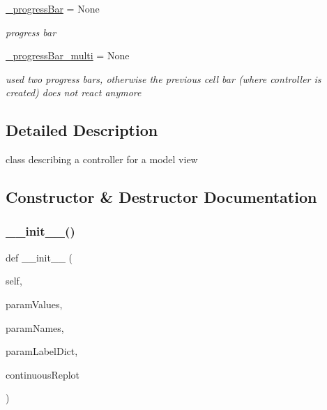 \begin{DoxyCompactItemize}
\hyperlink{class_mu_mo_t_1_1_mu_mo_tcontroller_a018864aa22d2adb0d3958fb0adbce8e2}{\+\_\+progress\+Bar} = None
\begin{DoxyCompactList}\small\item\em progress bar \end{DoxyCompactList}\item 
\hyperlink{class_mu_mo_t_1_1_mu_mo_tcontroller_a1da52cde6b2b94a1005eaa6898d2f8c5}{\+\_\+progress\+Bar\+\_\+multi} = None
\begin{DoxyCompactList}\small\item\em used two progress bars, otherwise the previous cell bar (where controller is created) does not react anymore \end{DoxyCompactList}\end{DoxyCompactItemize}


\subsection{Detailed Description}
class describing a controller for a model view 

\subsection{Constructor \& Destructor Documentation}
\mbox{\label{class_mu_mo_t_1_1_mu_mo_tcontroller_a73251532d0348adaeafe8a178cfc6a73}} 
\subsubsection{\texorpdfstring{\+\_\+\+\_\+init\+\_\+\+\_\+()}{\_\_init\_\_()}}
{\footnotesize\ttfamily def \+\_\+\+\_\+init\+\_\+\+\_\+ (\begin{DoxyParamCaption}\item[{}]{self,  }\item[{}]{param\+Values,  }\item[{}]{param\+Names,  }\item[{}]{param\+Label\+Dict,  }\item[{}]{continuous\+Replot }\end{DoxyParamCaption})}



